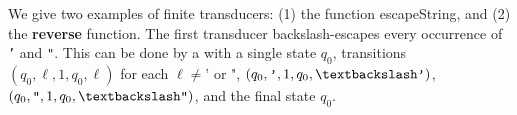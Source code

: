 \begin{example}\label{exmp-ft}
    We give two examples of finite transducers: %
    (1) the function escapeString, and (2) the \textbf{reverse} function.
%
%
%
The first transducer backslash-escapes every occurrence of \texttt{'} and 
\texttt{"}. This can be done by a \FT{} with a single state $q_0$,
transitions 
$(q_0, \ell, 1, q_0, \ell)$ for each $\ell \neq  \texttt{'}$  or $\texttt{"} $, 
$(q_0,\texttt{'}, 1, q_0, \textbackslash\texttt{'})$, 
$(q_0,\texttt{"}, 1, q_0, \textbackslash\texttt{"})$,  
and the final state $q_0$.


\end{example}
